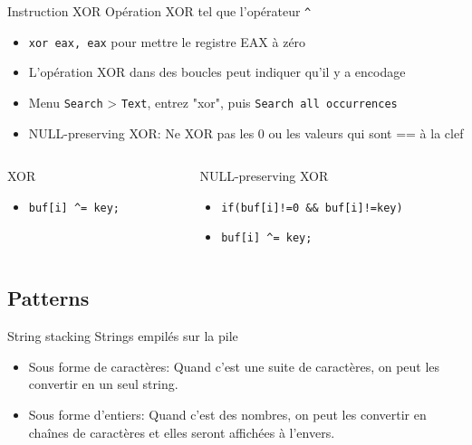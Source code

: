 \documentclass[10pt,xcolor={table,dvipsnames},t]{beamer}
\begin{document}
\begin{frame}{Instruction XOR}
    Opération XOR tel que l'opérateur \texttt{\textasciicircum}
    \begin{itemize}
        \item \texttt{xor eax, eax} pour mettre le registre EAX à zéro
        \item L'opération XOR dans des boucles peut indiquer qu'il y a encodage
        \item Menu \texttt{Search} > \texttt{Text}, entrez "xor", puis \texttt{Search all occurrences}
        \item NULL-preserving XOR: Ne XOR pas les 0 ou les valeurs qui sont == à la clef
    \end{itemize}
    
        \begin{columns}[T]
    
        \begin{column}{0.48\textwidth}
        XOR
        \begin{itemize}
            \item \texttt{buf[i] \textasciicircum= key;}
        \end{itemize}
        \end{column}
        
        \begin{column}{0.48\textwidth}
        NULL-preserving XOR
        \begin{itemize}
            \item \texttt{if(buf[i]!=0 \&\& buf[i]!=key)}
            \item \texttt{\quad buf[i] \textasciicircum= key;}
        \end{itemize}
        \end{column}
    
    \end{columns}
    
\end{frame}

\subsection{Patterns}

\begin{frame}{String stacking}
    Strings empilés sur la pile
    \begin{itemize}
        \item Sous forme de caractères: Quand c'est une suite de caractères, on peut les convertir en un seul string. 
        \item Sous forme d'entiers: Quand c'est des nombres, on peut les convertir en chaînes de caractères et elles seront affichées à l'envers.
    \end{itemize}

\end{frame}
\end{document}
